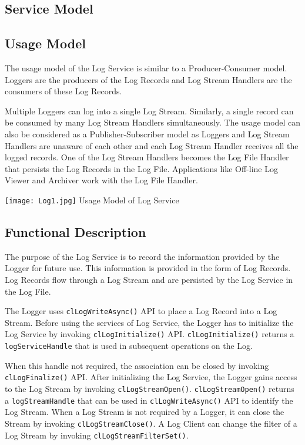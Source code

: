 \begin{flushleft}
\chapter{Service Model}
\section{Usage Model}
The usage model of the Log Service is similar to a Producer-Consumer model. Loggers are the producers of the Log Records and 
Log Stream Handlers are the consumers of these Log Records. 
\par
Multiple Loggers can log into a single Log Stream. Similarly, a single record can be consumed by many Log Stream Handlers simultaneously. 
The usage model can also be considered as a Publisher-Subscriber model as Loggers and Log Stream Handlers are unaware of each other and 
each Log Stream Handler receives all the logged records. One of the Log Stream Handlers becomes the Log File Handler that persists the Log 
Records in the Log File. Applications like Off-line Log Viewer and Archiver work with the Log File Handler.

\texttt{[image: Log1.jpg]}
Usage Model of Log Service


\section{Functional Description}
The purpose of the Log Service is to record the information provided by the Logger for future use. This information is provided in the form of Log
Records. Log Records flow through a Log Stream and are persisted by the Log Service in the Log File.
\par
The Logger uses {\tt{clLogWriteAsync()}} API to place a Log Record into a Log Stream. Before using the services of Log Service, the Logger has to 
initialize the Log Service by invoking {\tt{clLogInitialize()}} API. {\tt{clLogInitialize()}} returns a {\tt{logServiceHandle}} that is 
used in subsequent operations on the Log.
\par
When this handle not required, the association can be closed by invoking {\tt{clLogFinalize()}} API. 
After initializing the Log Service, the Logger gains access to the Log Stream by invoking {\tt{clLogStreamOpen()}}. 
{\tt{clLogStreamOpen()}} returns a {\tt{logStreamHandle}} that can be used in {\tt{clLogWriteAsync()}} API to identify the Log Stream. 
When a Log Stream is not required by a Logger, it can close the Stream by invoking {\tt{clLogStreamClose()}}. 
A Log Client can change the filter of a Log Stream by invoking {\tt{clLogStreamFilterSet()}}.


\end{flushleft}
